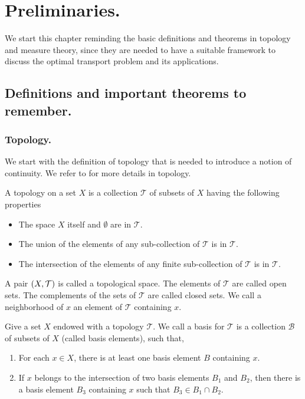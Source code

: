 \chapter{Preliminaries.}
We start this chapter reminding the basic definitions and theorems in topology and measure theory, since they are needed to have a suitable framework to discuss the optimal transport problem and its applications.

 
\section{Definitions and important theorems to remember.}

\subsection{Topology.}
We start with the definition of topology that is needed to introduce a notion of continuity. We refer to \cite{munkres2000topology} for more details in topology.

\begin{definition}[Topology]
	A topology on a set $X$ is a collection $\mathcal T$ of subsets of $X$ having the following properties
	\begin{itemize}
		\item  The space $X$ itself and $\emptyset$ are in $\mathcal T$.
		\item  The union of the elements of any sub-collection of $\mathcal T$ is in $\mathcal T$.
		\item The intersection of the elements of any finite sub-collection of $\mathcal T$ is in $\mathcal T$.
	\end{itemize}
\end{definition}

A pair $\left( X, \mathcal{T} \right)$ is called a topological space. The elements of $\mathcal T$ are called open sets. The complements of the sets of $\mathcal T$ are called closed sets. We call a neighborhood of $x$ an element of $\mathcal{T}$ containing $x$.

\begin{definition}
	Give a set $X$ endowed with a topology $\mathcal T$. We call a basis for $\mathcal{T}$ is a collection $\mathcal{B}$ of subsets of $X$ (called basis elements), such that,
	\begin{enumerate}
		\item  For each $x\in X$, there is at least one basis element $B$ containing $x$. 
		\item  If $x$ belongs to the intersection of two basis elements $B_1$ and $B_2$, then there is a basis element $B_3$ containing $x$ such that $B_3 \in B_1 \cap B_2$. 
	\end{enumerate}
\end{definition}

